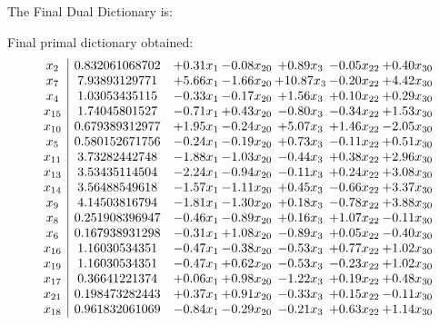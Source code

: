 \documentclass[8pt]{article}
\begin{document}
The Final Dual Dictionary is: 

 Final primal dictionary obtained: 
\[\begin{array}{c| c c@{\hskip 2pt} c@{\hskip 2pt} c@{\hskip 2pt} c@{\hskip 2pt} c@{\hskip 2pt} }
 x_{2}   &  0.832061068702 & +  0.31 x_{1} & -0.08 x_{20} & +  0.89 x_{3} & -0.05 x_{22} & +  0.40 x_{30}\\
 x_{7}   &  7.93893129771 & +  5.66 x_{1} & -1.66 x_{20} & + 10.87 x_{3} & -0.20 x_{22} & +  4.42 x_{30}\\
 x_{4}   &  1.03053435115 & -0.33 x_{1} & -0.17 x_{20} & +  1.56 x_{3} & +  0.10 x_{22} & +  0.29 x_{30}\\
 x_{15}   &  1.74045801527 & -0.71 x_{1} & +  0.43 x_{20} & -0.80 x_{3} & -0.34 x_{22} & +  1.53 x_{30}\\
 x_{10}   &  0.679389312977 & +  1.95 x_{1} & -0.24 x_{20} & +  5.07 x_{3} & +  1.46 x_{22} & -2.05 x_{30}\\
 x_{5}   &  0.580152671756 & -0.24 x_{1} & -0.19 x_{20} & +  0.73 x_{3} & -0.11 x_{22} & +  0.51 x_{30}\\
 x_{11}   &  3.73282442748 & -1.88 x_{1} & -1.03 x_{20} & -0.44 x_{3} & +  0.38 x_{22} & +  2.96 x_{30}\\
 x_{13}   &  3.53435114504 & -2.24 x_{1} & -0.94 x_{20} & -0.11 x_{3} & +  0.24 x_{22} & +  3.08 x_{30}\\
 x_{14}   &  3.56488549618 & -1.57 x_{1} & -1.11 x_{20} & +  0.45 x_{3} & -0.66 x_{22} & +  3.37 x_{30}\\
 x_{9}   &  4.14503816794 & -1.81 x_{1} & -1.30 x_{20} & +  0.18 x_{3} & -0.78 x_{22} & +  3.88 x_{30}\\
 x_{8}   &  0.251908396947 & -0.46 x_{1} & -0.89 x_{20} & +  0.16 x_{3} & +  1.07 x_{22} & -0.11 x_{30}\\
 x_{6}   &  0.167938931298 & -0.31 x_{1} & +  1.08 x_{20} & -0.89 x_{3} & +  0.05 x_{22} & -0.40 x_{30}\\
 x_{16}   &  1.16030534351 & -0.47 x_{1} & -0.38 x_{20} & -0.53 x_{3} & +  0.77 x_{22} & +  1.02 x_{30}\\
 x_{19}   &  1.16030534351 & -0.47 x_{1} & +  0.62 x_{20} & -0.53 x_{3} & -0.23 x_{22} & +  1.02 x_{30}\\
 x_{17}   &  0.36641221374 & +  0.06 x_{1} & +  0.98 x_{20} & -1.22 x_{3} & +  0.19 x_{22} & +  0.48 x_{30}\\
 x_{21}   &  0.198473282443 & +  0.37 x_{1} & +  0.91 x_{20} & -0.33 x_{3} & +  0.15 x_{22} & -0.11 x_{30}\\
 x_{18}   &  0.961832061069 & -0.84 x_{1} & -0.29 x_{20} & -0.21 x_{3} & +  0.63 x_{22} & +  1.14 x_{30}\\

\end{array}\]
\end{document}
